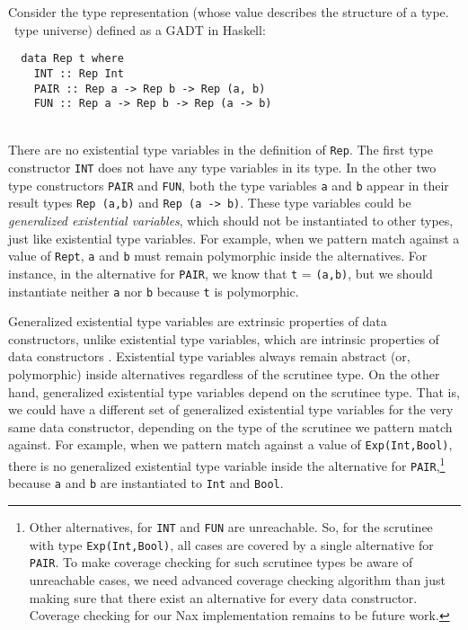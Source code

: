 Consider the type representation (whose value describes the structure of
a type. \aka\ type universe) defined as a GADT in Haskell:
\vspace*{-5ex}
\begin{singlespace}
\begin{verbatim}
  data Rep t where
    INT :: Rep Int
    PAIR :: Rep a -> Rep b -> Rep (a, b)
    FUN :: Rep a -> Rep b -> Rep (a -> b)
\end{verbatim}
\end{singlespace}
~\vspace*{-5ex}\\
There are no existential type variables in the definition of \texttt{Rep}.
The first type constructor \texttt{INT} does not have any type variables
in its type. In the other two type constructors \texttt{PAIR} and \texttt{FUN},
both the type variables \texttt{a} and \texttt{b} appear in their result types
\texttt{\;Rep~(a,b)\;} and \texttt{\;Rep~(a -> b)\;}. These type variables
could be \emph{generalized existential variables}, which should not be
instantiated to other types, just like existential type variables.
For example, when we pattern match against a value of \texttt{\;Rep\;t},
\texttt{a} and \texttt{b} must remain polymorphic inside the alternatives.
For instance, in the alternative for \texttt{PAIR}, we know that
\texttt{t} = \texttt{(a,b)}, but we should instantiate neither \texttt{a}
nor \texttt{b} because \texttt{t} is polymorphic.

Generalized existential type variables are
extrinsic properties of data constructors, unlike existential type variables,
which are intrinsic properties of data constructors \cite{Lin10thesis}.
Existential type variables always remain abstract (or, polymorphic) inside
alternatives regardless of the scrutinee type. On the other hand,
generalized existential type variables depend on the scrutinee type. That is,
we could have a different set of generalized existential type variables
for the very same data constructor, depending on the type of the scrutinee
we pattern match against. For example, when we pattern match against
a value of \texttt{Exp\;(Int,Bool)}, there is no generalized existential
type variable inside the alternative for \texttt{PAIR},\footnote{
	Other alternatives, for \texttt{INT} and \texttt{FUN} are unreachable.
	So, for the scrutinee with type \texttt{Exp\;(Int,Bool)}, all cases
	are covered by a single alternative for \texttt{PAIR}.
	To make coverage checking for such scrutinee types be aware of
	unreachable cases, we need advanced coverage checking algorithm than
	just making sure that there exist an alternative for
	every data constructor. Coverage checking for our Nax implementation
	remains to be future work.}
because
\texttt{a} and \texttt{b} are instantiated to \texttt{Int} and \texttt{Bool}.


